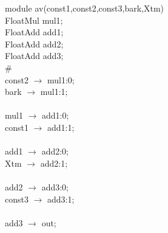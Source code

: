 \noindent module av(const1,const2,const3,bark,Xtm){ \\
\hspace*{2em}FloatMul mul1; \\
\hspace*{2em}FloatAdd add1; \\
\hspace*{2em}FloatAdd add2; \\
\hspace*{2em}FloatAdd add3; \\
\# \\
\hspace*{2em}const2 $\rightarrow$ mul1:0; \\
\hspace*{2em}bark $\rightarrow$ mul1:1; \\
   \\
   \hspace*{2em}mul1 $\rightarrow$ add1:0; \\
   \hspace*{2em}const1 $\rightarrow$ add1:1; \\
   \\
   \hspace*{2em}add1 $\rightarrow$ add2:0; \\
   \hspace*{2em}Xtm $\rightarrow$ add2:1; \\
   \\
   \hspace*{2em}add2 $\rightarrow$ add3:0; \\
   \hspace*{2em}const3 $\rightarrow$ add3:1; \\
   \\
   \hspace*{2em}add3 $\rightarrow$ out; \\
} \\
\\
\\
